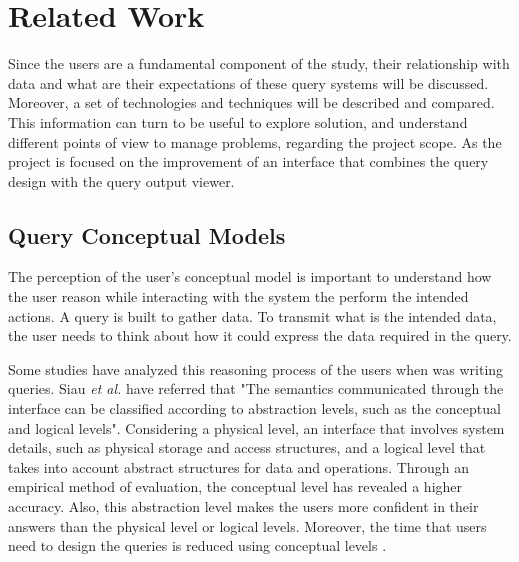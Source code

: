 \chapter{Related Work}
\label{cha:related_work}
Since the users are a fundamental component of the study, their relationship with data and what are their expectations of these query systems will be discussed. Moreover, a set of technologies and techniques will be described and compared. This information can turn to be useful to explore solution, and understand different points of view to manage problems, regarding the project scope. As the project is focused on the improvement of an interface that combines the query design with the query output viewer. 

\section{Query Conceptual Models}
\label{sec:query_conceptual_models}
The perception of the user's conceptual model is important to understand how the user reason while interacting with the system the perform the intended actions. A query is built to gather data. To transmit what is the intended data, the user needs to think about how it could express the data required in the query.


Some studies have analyzed this reasoning process of the users when was writing queries. Siau \textit{et al.} \cite{effectsOfQueryComplexityAndLearningOnNoviceUserQueryPerformance} have referred that "The semantics communicated through the interface can be classified according to abstraction levels, such as the conceptual and logical levels". Considering a physical level, an interface that involves system details, such as physical storage and access structures, and a logical level that takes into account abstract structures for data and operations. Through an empirical method of evaluation, the conceptual level has revealed a higher accuracy. Also, this abstraction level makes the users more confident in their answers than the physical level or logical levels. Moreover, the time that users need to design the queries is reduced using conceptual levels \cite{effectsOfQueryComplexityAndLearningOnNoviceUserQueryPerformance}.

